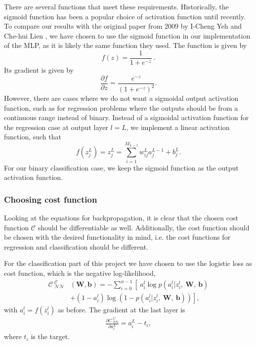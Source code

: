 \documentclass[a4paper, 11pt, twocolumn]{article}
\begin{document}
There are several functions that meet these requirements. Historically, the
sigmoid function has been a popular choice of activation function until recently.
To compare our results with the original paper from 2009 by I-Cheng Yeh and
Che-hui Lien \cite{origarticle}, we have chosen to use the sigmoid function in
our implementation of the MLP, as it is likely the same function they used. The
function is given by
\begin{equation}
	f(z) = \frac{1}{1+e^{-z}}\ .
\end{equation}
Its gradient is given by
\begin{equation}
	\label{eq:df/dz}
	\frac{\partial f}{\partial z} = \frac{e^{-z}}{(1+e^{-z})^2}.
\end{equation}
However, there are cases where we do not want a sigmoidal output activation
function, such as for regression problems where the outputs should be from a
continuous range instead of binary. Instead of a sigmoidal activation function
for the regression case at output layer $l=L$, we implement a linear activation
function, such that
\begin{equation}
f(z_j^L)=z_j^L= \sum_{i=1}^{M_{L-1}} w_{ij}^L a_j^{L-1} + b_j^L.
\end{equation}
For our binary classification case, we keep the sigmoid function as the output
activation function.
\subsubsection{Choosing cost function}
Looking at the equations for backpropagation, it is clear that the chosen cost
function $\mathcal{C}$ should be differentiable as well.
Additionally, the cost function should be chosen with the desired functionality
in mind, i.e. the cost functions for regression and classification should be different.

For the classification part of this project we have chosen to use the logistic
loss as cost function, which is the negative log-likelihood,
\begin{align}
\mathcal{C_\text{ NN}^\text{ C}}&(\bm{W}, \bm{b}) = -\sum_{i=0}^{n-1}
\left[\  a_i^l\log p\left(a_i^l|z_i^l,\ \bm{ W,\ b} \right) \right.  \\
&   \left. + (1-a_i^l)\log \left(1-p(a_i^l|z_i^l,\ \bm{ W,\ b} )\right) \right],
\nonumber
\end{align}
with $a_i^l=f(z_i^l)$ as before. The gradient at the last layer is
\begin{align}
\frac{ \partial C_\text{ NN}^\text{ C}}  {\partial a_i^L} =
a_i^L-t_i, \label{eq:dC/da_NN^C}
\end{align}
where $t_i$ is the target.\\
\end{document}
